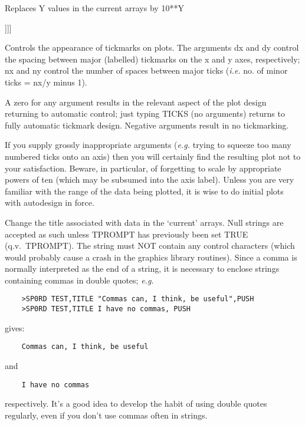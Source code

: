 \begin {description}
Replaces Y values in the current arrays by 10**Y

\item [TICKS] [dx [dy [nx [ny]]]]

Controls the appearance of tickmarks on plots. The arguments dx and dy
control the spacing between major (labelled) tickmarks on the x and y
axes, respectively;  nx and ny control the number of spaces between
major ticks ({\em i.e.} no. of minor ticks = nx/y minus 1).

A zero for any argument results in the relevant aspect of the plot
design returning to automatic control;   just typing TICKS (no
arguments) returns to fully automatic tickmark design. Negative
arguments result in no tickmarking.

If you supply grossly inappropriate arguments ({\em e.g.} trying to
squeeze too many numbered ticks onto an axis) then you will certainly
find the resulting plot not to your satisfaction.  Beware, in
particular, of forgetting to scale by appropriate powers of ten (which
may be subsumed into the axis label). Unless you are very familiar
with the range of the data being plotted, it is wise to do initial
plots with autodesign in force.

\item [TITLE] [string]

Change the title associated with data in the `current' arrays. Null
strings are accepted as such unless TPROMPT has previously been set
TRUE (q.v.\ TPROMPT). The string must NOT contain any control
characters (which would probably cause a crash in the graphics library
routines). Since a comma is normally interpreted as the end of a
string, it is necessary to enclose strings containing commas in double
quotes;  {\em e.g.}

\begin{verbatim}
    >SP0RD TEST,TITLE "Commas can, I think, be useful",PUSH
    >SP0RD TEST,TITLE I have no commas, PUSH
\end{verbatim}

gives:

\begin{verbatim}
    Commas can, I think, be useful
\end{verbatim}

and

\begin{verbatim}
    I have no commas
\end{verbatim}

respectively. It's a good idea to develop the habit of using double
quotes regularly, even if you don't use commas often in strings.


\end{description}
